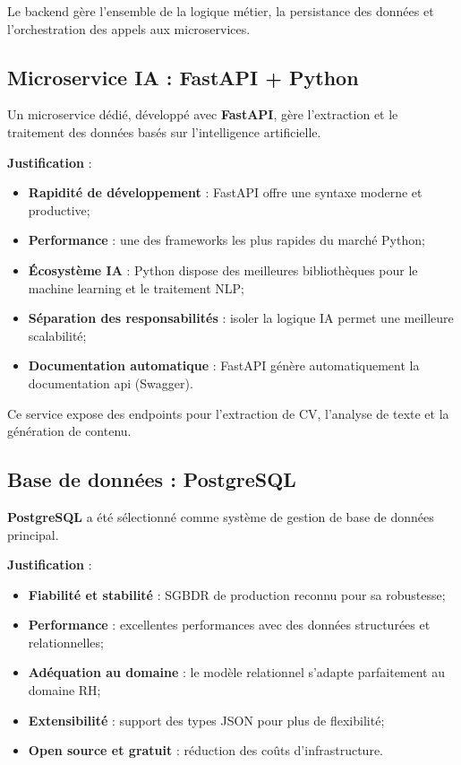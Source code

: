 Le backend gère l'ensemble de la logique métier, la persistance des données et l'orchestration des appels aux microservices.


\subsection{Microservice IA : FastAPI + Python}
\label{subsec:microservice-fastapi}

Un microservice dédié, développé avec \textbf{FastAPI}, gère l'extraction et le traitement des données basés sur l'intelligence artificielle.

\textbf{Justification} :

\begin{itemize}
    \item \textbf{Rapidité de développement} : FastAPI offre une syntaxe moderne et productive;
    
    \item \textbf{Performance} : une des frameworks les plus rapides du marché Python;
    
    \item \textbf{Écosystème IA} : Python dispose des meilleures bibliothèques pour le machine learning et le traitement NLP;
    
    \item \textbf{Séparation des responsabilités} : isoler la logique IA permet une meilleure scalabilité;
    
    \item \textbf{Documentation automatique} : FastAPI génère automatiquement la documentation \acrfull{api} (Swagger).
\end{itemize}

Ce service expose des endpoints pour l'extraction de CV, l'analyse de texte et la génération de contenu.


\subsection{Base de données : PostgreSQL}
\label{subsec:base-donnees-postgresql}

\textbf{PostgreSQL} a été sélectionné comme système de gestion de base de données principal.

\textbf{Justification} :

\begin{itemize}
    \item \textbf{Fiabilité et stabilité} : SGBDR de production reconnu pour sa robustesse;
    
    \item \textbf{Performance} : excellentes performances avec des données structurées et relationnelles;
    
    \item \textbf{Adéquation au domaine} : le modèle relationnel s'adapte parfaitement au domaine RH;
    
    \item \textbf{Extensibilité} : support des types JSON pour plus de flexibilité;
    
    \item \textbf{Open source et gratuit} : réduction des coûts d'infrastructure.
\end{itemize}

